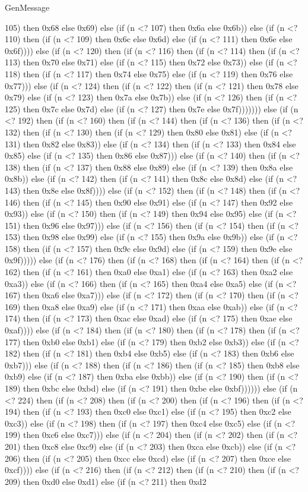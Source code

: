 \begin{lexlean}{GenMessage}
\begin{semanticmodule}
{105) then 0x68 else 0x69) else (if (n <? 107) then 0x6a else 0x6b)) else (if (n <? 110) then (if (n <? 109) then 0x6c else 0x6d) else (if (n <? 111) then 0x6e else 0x6f)))) else (if (n <? 120) then (if (n <? 116) then (if (n <? 114) then (if (n <? 113) then 0x70 else 0x71) else (if (n <? 115) then 0x72 else 0x73)) else (if (n <? 118) then (if (n <? 117) then 0x74 else 0x75) else (if (n <? 119) then 0x76 else 0x77))) else (if (n <? 124) then (if (n <? 122) then (if (n <? 121) then 0x78 else 0x79) else (if (n <? 123) then 0x7a else 0x7b)) else (if (n <? 126) then (if (n <? 125) then 0x7c else 0x7d) else (if (n <? 127) then 0x7e else 0x7f))))))) else (if (n <? 192) then (if (n <? 160) then (if (n <? 144) then (if (n <? 136) then (if (n <? 132) then (if (n <? 130) then (if (n <? 129) then 0x80 else 0x81) else (if (n <? 131) then 0x82 else 0x83)) else (if (n <? 134) then (if (n <? 133) then 0x84 else 0x85) else (if (n <? 135) then 0x86 else 0x87))) else (if (n <? 140) then (if (n <? 138) then (if (n <? 137) then 0x88 else 0x89) else (if (n <? 139) then 0x8a else 0x8b)) else (if (n <? 142) then (if (n <? 141) then 0x8c else 0x8d) else (if (n <? 143) then 0x8e else 0x8f)))) else (if (n <? 152) then (if (n <? 148) then (if (n <? 146) then (if (n <? 145) then 0x90 else 0x91) else (if (n <? 147) then 0x92 else 0x93)) else (if (n <? 150) then (if (n <? 149) then 0x94 else 0x95) else (if (n <? 151) then 0x96 else 0x97))) else (if (n <? 156) then (if (n <? 154) then (if (n <? 153) then 0x98 else 0x99) else (if (n <? 155) then 0x9a else 0x9b)) else (if (n <? 158) then (if (n <? 157) then 0x9c else 0x9d) else (if (n <? 159) then 0x9e else 0x9f))))) else (if (n <? 176) then (if (n <? 168) then (if (n <? 164) then (if (n <? 162) then (if (n <? 161) then 0xa0 else 0xa1) else (if (n <? 163) then 0xa2 else 0xa3)) else (if (n <? 166) then (if (n <? 165) then 0xa4 else 0xa5) else (if (n <? 167) then 0xa6 else 0xa7))) else (if (n <? 172) then (if (n <? 170) then (if (n <? 169) then 0xa8 else 0xa9) else (if (n <? 171) then 0xaa else 0xab)) else (if (n <? 174) then (if (n <? 173) then 0xac else 0xad) else (if (n <? 175) then 0xae else 0xaf)))) else (if (n <? 184) then (if (n <? 180) then (if (n <? 178) then (if (n <? 177) then 0xb0 else 0xb1) else (if (n <? 179) then 0xb2 else 0xb3)) else (if (n <? 182) then (if (n <? 181) then 0xb4 else 0xb5) else (if (n <? 183) then 0xb6 else 0xb7))) else (if (n <? 188) then (if (n <? 186) then (if (n <? 185) then 0xb8 else 0xb9) else (if (n <? 187) then 0xba else 0xbb)) else (if (n <? 190) then (if (n <? 189) then 0xbc else 0xbd) else (if (n <? 191) then 0xbe else 0xbf)))))) else (if (n <? 224) then (if (n <? 208) then (if (n <? 200) then (if (n <? 196) then (if (n <? 194) then (if (n <? 193) then 0xc0 else 0xc1) else (if (n <? 195) then 0xc2 else 0xc3)) else (if (n <? 198) then (if (n <? 197) then 0xc4 else 0xc5) else (if (n <? 199) then 0xc6 else 0xc7))) else (if (n <? 204) then (if (n <? 202) then (if (n <? 201) then 0xc8 else 0xc9) else (if (n <? 203) then 0xca else 0xcb)) else (if (n <? 206) then (if (n <? 205) then 0xcc else 0xcd) else (if (n <? 207) then 0xce else 0xcf)))) else (if (n <? 216) then (if (n <? 212) then (if (n <? 210) then (if (n <? 209) then 0xd0 else 0xd1) else (if (n <? 211) then 0xd2 }
\end{semanticmodule}
\end{lexlean}
